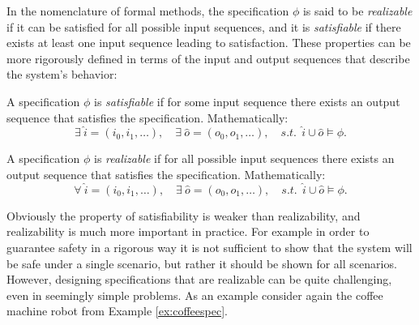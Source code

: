 In the nomenclature of formal methods, the specification $\phi$ is said to be \textit{realizable} if it can be satisfied for all possible input sequences, and it is \textit{satisfiable} if there exists at least one input sequence leading to satisfaction. These properties can be more rigorously defined in terms of the input and output sequences that describe the system's behavior:
\begin{definition}[Satisfiability]
A specification $\phi$ is \textit{satisfiable} if for some input sequence there exists an output sequence that satisfies the specification. Mathematically:
\begin{equation*}
\exists \: \hat{i} = (i_0, i_1, \dots), \quad \exists \: \hat{o} = (o_0, o_1, \dots), \quad s.t. \:\: \hat{i} \cup \hat{o} \models \phi.
\end{equation*}
\end{definition}
\begin{definition}[Realizability]
A specification $\phi$ is \textit{realizable} if for all possible input sequences there exists an output sequence that satisfies the specification. Mathematically:
\begin{equation*}
\forall \: \hat{i} = (i_0, i_1, \dots), \quad \exists \: \hat{o} = (o_0, o_1, \dots), \quad s.t. \:\: \hat{i} \cup \hat{o} \models \phi.
\end{equation*}
\end{definition}

Obviously the property of satisfiability is weaker than realizability, and realizability is much more important in practice. For example in order to guarantee safety in a rigorous way it is not sufficient to show that the system will be safe under a single scenario, but rather it should be shown for all scenarios. However, designing specifications that are realizable can be quite challenging, even in seemingly simple problems. As an example consider again the coffee machine robot from Example \ref{ex:coffeespec}.

